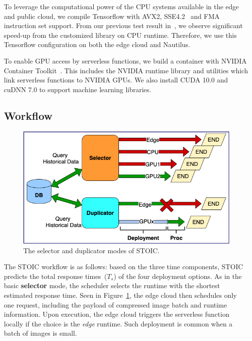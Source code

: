To leverage the computational power of the CPU systems available in the edge and public cloud, we compile Tensorflow with AVX2, SSE4.2~\cite{ref:avx} and FMA~\cite{ref:fma} instruction set support. From our previous test result in~\cite{ref:stoic}, we observe significant speed-up from the customized library on CPU runtime. Therefore, we use this Tensorflow configuration on both the edge cloud and Nautilus.
 
To enable GPU access by serverless functions, we build a container with NVIDIA Container Toolkit~\cite{ref:nvidia}. This includes the NVIDIA runtime library and utilities which link serverless functions to NVIDIA GPUs. We also install CUDA 10.0 and cuDNN 7.0 to support machine learning libraries.
 
 
 \subsection{Workflow}

\begin{figure}[t] \centering 
\includegraphics[scale=0.33]{figures/selector_duplicator.png}
\caption{The selector and duplicator modes of STOIC. 
\label{fig:duplicator}}
\end{figure}

The STOIC workflow is as follows: based on the three time components, STOIC predicts the total response times~($T_s$) of the four deployment options. As in the basic \textbf{selector} mode, the scheduler selects the runtime with the shortest estimated response time. Seen in Figure~\ref{fig:duplicator}, the edge cloud then schedules only one request, including the payload of compressed image batch and runtime information. Upon execution, the edge cloud triggers the serverless function locally if the choice is the \textit{edge} runtime. Such deployment is common when a batch of images is small. 

